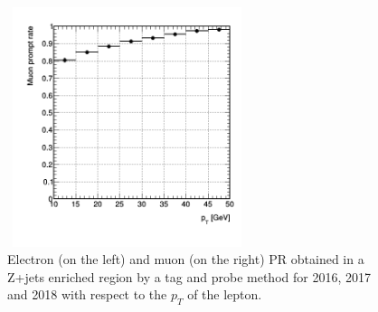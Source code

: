 \documentclass[a4paper, 10pt, openright]{report}
\begin{document}
\begin{figure}[htbp]
{\begin{minipage}[b]{.48\textwidth}
\end{minipage}\hfill
\begin{minipage}[b]{.48\textwidth}
\includegraphics[width=7cm, height=7cm]{figs/Muon_PR_pt_2017.png}
\end{minipage} \hfill
}
\caption{Electron (on the left) and muon (on the right) \ac{PR} obtained in a Z+jets enriched region by a tag and probe method for 2016, 2017 and 2018 with respect to the $p_T$ of the lepton.}
\label{fig:PR}
\end{figure}
\end{document}
